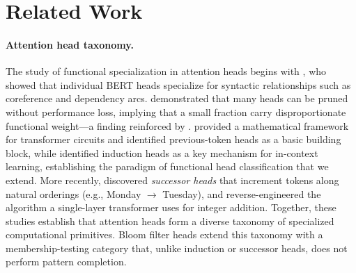 \documentclass[11pt]{article}
\begin{document}
\section{Related Work}

\paragraph{Attention head taxonomy.}
The study of functional specialization in attention heads begins with \citet{clark2019what}, who showed that individual BERT heads specialize for syntactic relationships such as coreference and dependency arcs. \citet{voita2019analyzing} demonstrated that many heads can be pruned without performance loss, implying that a small fraction carry disproportionate functional weight---a finding reinforced by \citet{michel2019sixteen}. \citet{elhage2021mathematical} provided a mathematical framework for transformer circuits and identified previous-token heads as a basic building block, while \citet{olsson2022context} identified induction heads as a key mechanism for in-context learning, establishing the paradigm of functional head classification that we extend. More recently, \citet{gould2023successor} discovered \emph{successor heads} that increment tokens along natural orderings (e.g., Monday $\to$ Tuesday), and \citet{quirke2023understanding} reverse-engineered the algorithm a single-layer transformer uses for integer addition. Together, these studies establish that attention heads form a diverse taxonomy of specialized computational primitives. Bloom filter heads extend this taxonomy with a membership-testing category that, unlike induction or successor heads, does not perform pattern completion.
\end{document}
